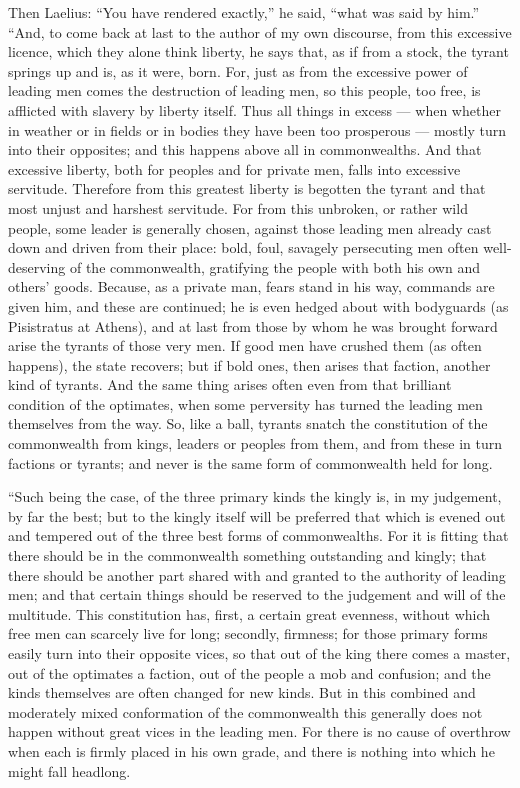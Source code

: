  Then Laelius: ``You have rendered exactly,'' he said, ``what was said by him.'' ``And, to come back at last to the author of my own discourse, from this excessive licence, which they alone think liberty, he says that, as if from a stock, the tyrant springs up and is, as it were, born. For, just as from the excessive power of leading men comes the destruction of leading men, so this people, too free, is afflicted with slavery by liberty itself. Thus all things in excess --- when whether in weather or in fields or in bodies they have been too prosperous --- mostly turn into their opposites; and this happens above all in commonwealths. And that excessive liberty, both for peoples and for private men, falls into excessive servitude. Therefore from this greatest liberty is begotten the tyrant and that most unjust and harshest servitude. For from this unbroken, or rather wild people, some leader is generally chosen, against those leading men already cast down and driven from their place: bold, foul, savagely persecuting men often well-deserving of the commonwealth, gratifying the people with both his own and others' goods. Because, as a private man, fears stand in his way, commands are given him, and these are continued; he is even hedged about with bodyguards (as Pisistratus at Athens), and at last from those by whom he was brought forward arise the tyrants of those very men. If good men have crushed them (as often happens), the state recovers; but if bold ones, then arises that faction, another kind of tyrants. And the same thing arises often even from that brilliant condition of the optimates, when some perversity has turned the leading men themselves from the way. So, like a ball, tyrants snatch the constitution of the commonwealth from kings, leaders or peoples from them, and from these in turn factions or tyrants; and never is the same form of commonwealth held for long.

 ``Such being the case, of the three primary kinds the kingly is, in my judgement, by far the best; but to the kingly itself will be preferred that which is evened out and tempered out of the three best forms of commonwealths. For it is fitting that there should be in the commonwealth something outstanding and kingly; that there should be another part shared with and granted to the authority of leading men; and that certain things should be reserved to the judgement and will of the multitude. This constitution has, first, a certain great evenness, without which free men can scarcely live for long; secondly, firmness; for those primary forms easily turn into their opposite vices, so that out of the king there comes a master, out of the optimates a faction, out of the people a mob and confusion; and the kinds themselves are often changed for new kinds. But in this combined and moderately mixed conformation of the commonwealth this generally does not happen without great vices in the leading men. For there is no cause of overthrow when each is firmly placed in his own grade, and there is nothing into which he might fall headlong.

